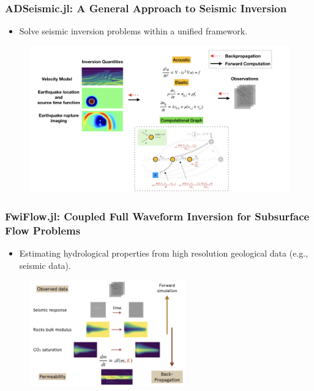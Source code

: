 \documentclass{beamer}
\begin{document}
\begin{frame}
	\frametitle{ADSeismic.jl: A General Approach to Seismic Inversion}
	\begin{itemize}
		\item Solve seismic inversion problems within a unified framework. 
	\end{itemize}
	\begin{figure}[hbt]
  \includegraphics[width=1.0\textwidth]{figures/adseimic.jpeg}
\end{figure}
	
\end{frame}

\begin{frame}
	\frametitle{FwiFlow.jl: Coupled Full Waveform Inversion for Subsurface Flow Problems}
	\begin{itemize}
		\item Estimating hydrological properties from high resolution geological data (e.g., seismic data). 
	\end{itemize}
	\begin{figure}[hbt]
  \includegraphics[width=0.6\textwidth]{figures/geo.png}
\end{figure}
\end{frame}
\end{document}
